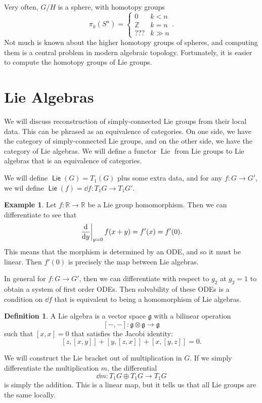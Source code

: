 \documentclass[leqno, openany]{memoir}
\theoremstyle{definition}
\newtheorem{defn}[thm]{Definition}
\newtheorem{exm}[thm]{Example}
\theoremstyle{remark}
\theoremstyle{plain}
\theoremstyle{definition}
\theoremstyle{remark}
\newcommand{\R}{\mathbb{R}}
\newcommand{\Z}{\mathbb{Z}}
\newcommand{\mf}[1]{\mathfrak{#1}}
\DeclareMathOperator{\Lie}{\mathsf{Lie}}
\begin{document}
Very often, $G/H$ is a sphere, with homotopy groups
\[ \pi_k(S^n) = \begin{cases}
    0 & k < n \\
    \Z & k = n \\
    ??? & k \gg n
\end{cases}. \]
Not much is known about the higher homotopy groups of spheres, and computing them is a central problem in modern algebraic topology. Fortunately, it is easier to compute the homotopy groups of Lie groups.

\section{Lie Algebras}%
\label{sec:lie_algebras}

We will discuss reconstruction of simply-connected Lie groups from their local data. This can be phrased as an equivalence of categories. On one side, we have the category of simply-connected Lie groups, and on the other side, we have the category of Lie algebras. We will define a functor $\operatorname{Lie}$ from Lie groups to Lie algebras that is an equivalence of categories.

We will define $\Lie(G) = T_1(G)$ plus some extra data, and for any $f \colon G \to G'$, we wil define $\Lie(f) = \dd f \colon T_1 G \to T_1 G'$.

\begin{exm}
    Let $f \colon \R \to \R$ be a Lie group homomorphism. Then we can differentiate to see that 
    \[ \eval{\dv{y}}_{y = 0} f(x+y) = f'(x) = f'(0). \]
    This means that the morphism is determined by an ODE, and so it must be linear. Then $f'(0)$ is precisely the map between Lie algebras.
\end{exm}

In general for $f \colon G \to G'$, then we can differentiate with respect to $g_2$ at $g_2 = 1$ to obtain a system of first order ODEs. Then solvability of these ODEs is a condition on $\dd f$ that is equivalent to being a homomorphism of Lie algebras.

\begin{defn}
    A Lie algebra is a vector space $\mf{g}$ with a bilinear operation
    \[ [-,-] \colon \mf{g} \otimes \mf{g} \to \mf{g} \]
    such that $[x,x] = 0$ that satisfies the Jacobi identity:
    \[ [z, [x,y]] + [y, [z,x]] + [x, [y,z]] = 0. \]
\end{defn}

We will construct the Lie bracket out of multiplication in $G$. If we simply differentiate the multiplication $m$, the differential 
\[ \dd m \colon T_1 G \oplus T_1 G \to T_1 G \]
is simply the addition. This is a linear map, but it tells us that all Lie groups are the same locally.
\end{document}
